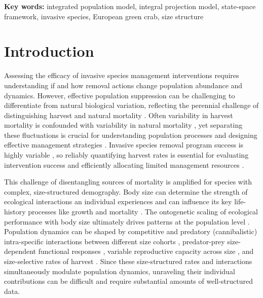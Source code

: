 \documentclass{article}
\begin{document}
\textbf{Key words:} integrated population model, integral projection model, state-space framework, invasive species, European green crab, size structure

\newpage

\section{Introduction}

Assessing the efficacy of invasive species management interventions requires understanding if and how removal actions change population abundance and dynamics. However, effective population suppression can be challenging to differentiate from natural biological variation, reflecting the perennial challenge of distinguishing harvest and natural mortality \parencite{aanes2007estimation}. Often variability in harvest mortality is confounded with variability in natural mortality \parencite{lewy2003modelling}, yet separating these fluctuations is crucial for understanding population processes and designing effective management strategies \parencite{walters2004fisheries}. Invasive species removal program success is highly variable \parencite{prior2018does}, so reliably quantifying harvest rates is essential for evaluating intervention success and efficiently allocating limited management resources \parencite{green2021functional}.

This challenge of disentangling sources of mortality is amplified for species with complex, size-structured demography. Body size can determine the strength of ecological interactions an individual experiences and can influence its key life-history processes like growth and mortality \parencite{de2003influence}. The ontogenetic scaling of ecological performance with body size ultimately drives patterns at the population level \parencite{werner1994ontogenetic}. Population dynamics can be shaped by competitive and predatory (cannibalistic) intra-specific interactions between different size cohorts \parencite{claessen2004population}, predator-prey size-dependent functional responses \parencite{aljetlawi2004prey}, variable reproductive capacity across size \parencite{hixon2014boffffs}, and size-selective rates of harvest \parencite{tu2018fishing}. Since these size-structured rates and interactions simultaneously modulate population dynamics, unraveling their individual contributions can be difficult and require substantial amounts of well-structured data. 
\end{document}
